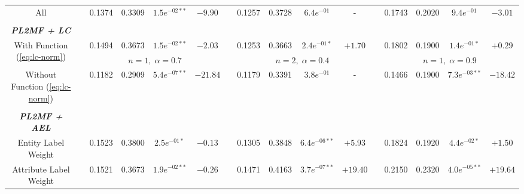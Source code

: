 \begin{table*}
{\begin{tabular}{cc@{\hs}rrccc@{\hs}rrccc@{\hs}rrcc}
{\raggedright All} & \phantom{a} & 0.1374 & 0.3309 & $1.5e^{-02**}$ & $-9.90$
                   & \phantom{a} & 0.1257 & 0.3728 & $6.4e^{-01}$ & -
                   & \phantom{a} & 0.1743 & 0.2020 & $9.4e^{-01}$ & $-3.01$
       \\
\\
\emph{\textbf{PL2MF + LC}} & \multicolumn{15}{c}{\phantom{a}} \\
\multirow{2}{*}{{\raggedright With Function (\ref{eq:lc-norm})}} & \phantom{a} & 0.1494 & 0.3673 & $1.5e^{-02**}$ & $-2.03$
                                                & \phantom{a} & 0.1253 & 0.3663 & $2.4e^{-01*}$ & $+1.70$
                                                & \phantom{a} & 0.1802 & 0.1900 & $1.4e^{-01*}$ & $+0.29$ \\%
 & \phantom{a} & \multicolumn{4}{c}{$n=1,\;\alpha=0.7$}
   & \phantom{a} & \multicolumn{4}{c}{$n=2,\;\alpha=0.4$}
   & \phantom{a} & \multicolumn{4}{c}{$n=1,\;\alpha=0.9$} \\
{\raggedright Without Function (\ref{eq:lc-norm})} & \phantom{a} & 0.1182 & 0.2909 & $5.4e^{-07**}$ & $-21.84$
                                                   & \phantom{a} & 0.1179 & 0.3391 & $3.8e^{-01}$ & -
                                                   & \phantom{a} & 0.1466 & 0.1900 & $7.3e^{-03**}$ & $-18.42$
                                       \\
\\
\emph{\textbf{PL2MF + AEL}} & \multicolumn{15}{c}{\phantom{a}} \\
{\raggedright Entity Label Weight} & \phantom{a} & 0.1523 & 0.3800 & $2.5e^{-01*}$ & $-0.13$
                                   & \phantom{a} & 0.1305 & 0.3848 & $6.4e^{-06**}$ & $+5.93$
                                   & \phantom{a} & 0.1824 & 0.1920 & $4.4e^{-02*}$ & $+1.50$
                       \\
{\raggedright Attribute Label Weight} & \phantom{a} & 0.1521 & 0.3673 & $1.9e^{-02**}$ & $-0.26$
                                      & \phantom{a} & 0.1471 & 0.4163 & $3.7e^{-07**}$ & $+19.40$
                                      & \phantom{a} & 0.2150 & 0.2320 & $4.0e^{-05**}$ & $+19.64$

\end{tabular}}
\end{table*}
